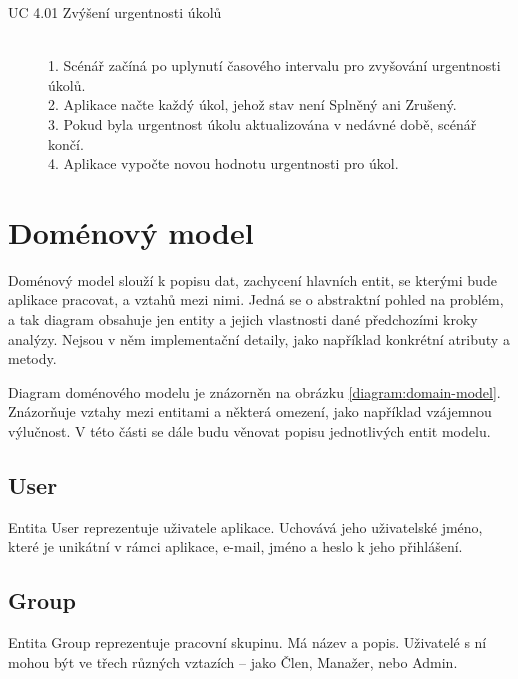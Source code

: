 \documentclass[thesis=B,czech]{FITthesis}[2012/06/26]
\begin{document}
			\begin{description}
				\item[UC 4.01 Zvýšení urgentnosti úkolů] \hfill \\
					1. Scénář začíná po uplynutí časového intervalu pro zvyšování urgentnosti úkolů. \\
					2. Aplikace načte každý úkol, jehož stav není Splněný ani Zrušený. \\
					3. Pokud byla urgentnost úkolu aktualizována v nedávné době, scénář končí. \\
					4. Aplikace vypočte novou hodnotu urgentnosti pro úkol. \\
			\end{description}
			
			
			
			
			
		
		

		
	\section{Doménový model}
		\label{sec:domain-model}
		Doménový model slouží k popisu dat, zachycení hlavních entit, se kterými bude aplikace pracovat, a vztahů mezi nimi. \cite{domain-model} Jedná se o abstraktní pohled na problém, a tak diagram obsahuje jen entity a jejich vlastnosti dané předchozími kroky analýzy. Nejsou v něm implementační detaily, jako například konkrétní atributy a metody.
		
		Diagram doménového modelu je znázorněn na obrázku \ref{diagram:domain-model}. Znázorňuje vztahy mezi entitami a některá omezení, jako například vzájemnou výlučnost. \cite{domain-model-multiple-association} V této části se dále budu věnovat popisu jednotlivých entit modelu.
		
		\subsection{User}
			Entita User reprezentuje uživatele aplikace. Uchovává jeho uživatelské jméno, které je unikátní v rámci aplikace, e-mail, jméno a heslo k jeho přihlášení.
			
		\subsection{Group}
			Entita Group reprezentuje pracovní skupinu. Má název a popis. Uživatelé s ní mohou být ve třech různých vztazích -- jako Člen, Manažer, nebo Admin. 
		
\end{document}
